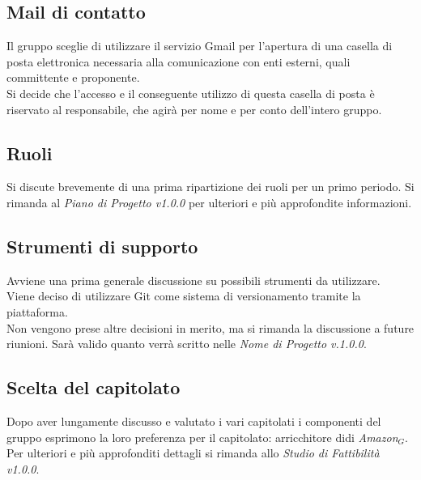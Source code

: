 \documentclass[a4paper,12pt]{article}
\begin{document}
	\subsection{Mail di contatto}
	Il gruppo sceglie di utilizzare il servizio Gmail per l'apertura di una casella di posta elettronica necessaria alla comunicazione con enti esterni, quali committente e proponente.\\
	Si decide che l'accesso e il conseguente utilizzo di questa casella di posta è riservato al responsabile, che agirà per nome e per conto dell'intero gruppo. 
	\subsection{Ruoli}
	Si discute brevemente di una prima ripartizione dei ruoli per un primo periodo. Si rimanda al \textit{Piano di Progetto v1.0.0} per ulteriori e più approfondite informazioni.
	\subsection{Strumenti di supporto}
	Avviene una prima generale discussione su possibili strumenti da utilizzare. \\
	Viene deciso di utilizzare Git come sistema di versionamento tramite la piattaforma. \\
	Non vengono prese altre decisioni in merito, ma si rimanda la discussione a future riunioni. 
	Sarà valido quanto verrà scritto nelle \textit{Nome di Progetto v.1.0.0}.
	\subsection{Scelta del capitolato}
	Dopo aver lungamente discusso e valutato i vari capitolati i componenti del gruppo esprimono la loro preferenza per il capitolato: arricchitore didi \textit{Amazon$_{G}$}. Per ulteriori e più approfonditi dettagli si rimanda allo \textit{Studio di Fattibilità v1.0.0}.
	\label{LastPage}
\end{document}
